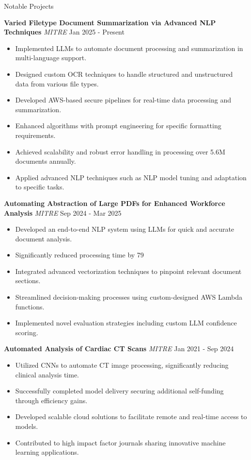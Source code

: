 \documentclass{resume} %
\begin{document}
\begin{rSection}{Notable Projects}

\textbf{Varied Filetype Document Summarization via Advanced NLP Techniques} \textit{MITRE}
\hfill Jan 2025 - Present
\begin{itemize}
    \item Implemented LLMs to automate document processing and summarization in multi-language support.
    \item Designed custom OCR techniques to handle structured and unstructured data from various file types.
    \item Developed AWS-based secure pipelines for real-time data processing and summarization.
    \item Enhanced algorithms with prompt engineering for specific formatting requirements.
    \item Achieved scalability and robust error handling in processing over 5.6M documents annually.
    \item Applied advanced NLP techniques such as NLP model tuning and adaptation to specific tasks.
\end{itemize}

\textbf{Automating Abstraction of Large PDFs for Enhanced Workforce Analysis} \textit{MITRE}
\hfill Sep 2024 - Mar 2025
\begin{itemize}
    \item Developed an end-to-end NLP system using LLMs for quick and accurate document analysis.
    \item Significantly reduced processing time by 79%
    \item Integrated advanced vectorization techniques to pinpoint relevant document sections.
    \item Streamlined decision-making processes using custom-designed AWS Lambda functions.
    \item Implemented novel evaluation strategies including custom LLM confidence scoring.
\end{itemize}

\textbf{Automated Analysis of Cardiac CT Scans} \textit{MITRE}
\hfill Jan 2021 - Sep 2024
\begin{itemize}
    \item Utilized CNNs to automate CT image processing, significantly reducing clinical analysis time.
    \item Successfully completed model delivery securing additional self-funding through efficiency gains.
    \item Developed scalable cloud solutions to facilitate remote and real-time access to models.
    \item Contributed to high impact factor journals sharing innovative machine learning applications.
\end{itemize}

\end{rSection}
\end{document}
